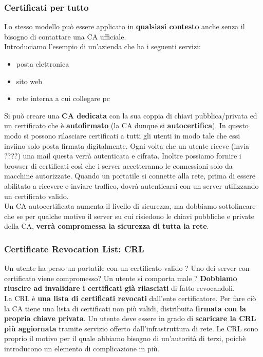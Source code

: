 \documentclass[12pt]{article}
\begin{document}
			\subsubsection{Certificati per tutto}
				Lo stesso modello può essere applicato in \textbf{qualsiasi contesto} anche senza il bisogno di contattare una CA ufficiale.\\
				Introduciamo l'esempio di un'azienda che ha i seguenti servizi:
				\begin{itemize}
					\item posta elettronica
					\item sito web
					\item rete interna a cui collegare pc
				\end{itemize}
				Si può creare una \textbf{CA dedicata} con la sua coppia di 
				chiavi pubblica/privata ed un certificato che è \textbf{autofirmato} (la CA dunque si \textbf{autocertifica}). In questo modo si possono rilasciare certificati a tutti gli utenti in modo tale che essi inviino solo posta firmata digitalmente. Ogni volta che un utente riceve (invia ????) una mail questa verrà autenticata e cifrata. Inoltre possiamo fornire i browser di certificati così che i server accetteranno le connessioni solo da macchine autorizzate. Quando un portatile si connette alla rete, prima di essere abilitato a ricevere e inviare traffico, dovrà autenticarsi con un server utilizzando un certificato valido.\\
				Un CA autocertificata aumenta il livello di sicurezza, ma dobbiamo sottolineare che se per qualche motivo il server su cui risiedono le chiavi pubbliche e private della CA, \textbf{verrà compromessa la sicurezza di tutta la rete}.
			\subsubsection{Certificate Revocation List: CRL}
				Un utente ha perso un portatile con un certificato valido ? Uno dei server con certificato viene compromesso? Un utente si comporta male ? \textbf{Dobbiamo riuscire ad invalidare i certificati già rilasciati} di fatto revocandoli.\\
				La CRL è \textbf{una lista di certificati revocati} dall'ente certificatore. Per fare ciò la CA tiene una lista di certificati non più validi, distribuita \textbf{firmata con la propria chiave privata}. Un utente deve essere in grado di \textbf{scaricare la CRL più aggiornata} tramite servizio offerto dall'infrastruttura di rete. Le CRL sono proprio il motivo per il quale abbiamo bisogno di un'autorità di terzi, poichè introducono un elemento di complicazione in più.
\end{document}
